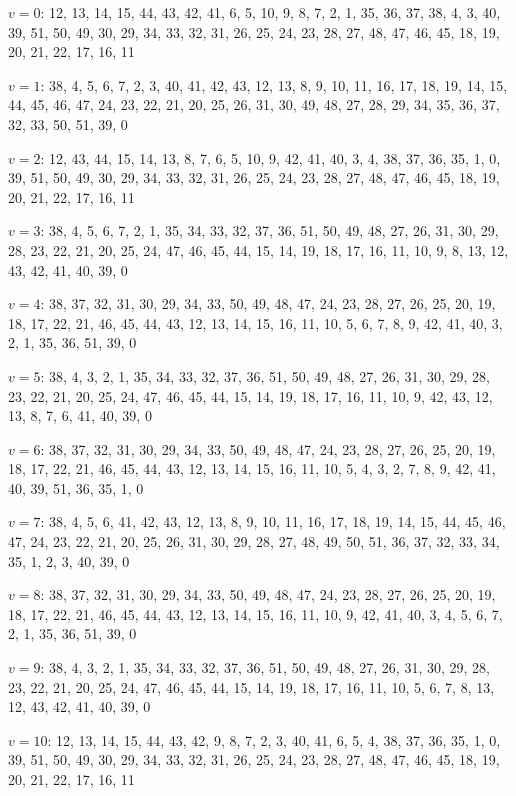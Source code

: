 \documentclass{amcjoucc}
\begin{document}
\begin{itemize}
{\footnotesize
\item $v = 0$: 12, 13, 14, 15, 44, 43, 42, 41, 6, 5, 10, 9, 8, 7, 2, 1, 35, 36, 37, 38, 4, 3, 40, 39, 51, 50, 49, 30, 29, 34, 33, 32, 31, 26, 25, 24, 23, 28, 27, 48, 47, 46, 45, 18, 19, 20, 21, 22, 17, 16, 11
\item $v = 1$: 38, 4, 5, 6, 7, 2, 3, 40, 41, 42, 43, 12, 13, 8, 9, 10, 11, 16, 17, 18, 19, 14, 15, 44, 45, 46, 47, 24, 23, 22, 21, 20, 25, 26, 31, 30, 49, 48, 27, 28, 29, 34, 35, 36, 37, 32, 33, 50, 51, 39, 0
\item $v = 2$: 12, 43, 44, 15, 14, 13, 8, 7, 6, 5, 10, 9, 42, 41, 40, 3, 4, 38, 37, 36, 35, 1, 0, 39, 51, 50, 49, 30, 29, 34, 33, 32, 31, 26, 25, 24, 23, 28, 27, 48, 47, 46, 45, 18, 19, 20, 21, 22, 17, 16, 11
\item $v = 3$: 38, 4, 5, 6, 7, 2, 1, 35, 34, 33, 32, 37, 36, 51, 50, 49, 48, 27, 26, 31, 30, 29, 28, 23, 22, 21, 20, 25, 24, 47, 46, 45, 44, 15, 14, 19, 18, 17, 16, 11, 10, 9, 8, 13, 12, 43, 42, 41, 40, 39, 0
\item $v = 4$: 38, 37, 32, 31, 30, 29, 34, 33, 50, 49, 48, 47, 24, 23, 28, 27, 26, 25, 20, 19, 18, 17, 22, 21, 46, 45, 44, 43, 12, 13, 14, 15, 16, 11, 10, 5, 6, 7, 8, 9, 42, 41, 40, 3, 2, 1, 35, 36, 51, 39, 0
\item $v = 5$: 38, 4, 3, 2, 1, 35, 34, 33, 32, 37, 36, 51, 50, 49, 48, 27, 26, 31, 30, 29, 28, 23, 22, 21, 20, 25, 24, 47, 46, 45, 44, 15, 14, 19, 18, 17, 16, 11, 10, 9, 42, 43, 12, 13, 8, 7, 6, 41, 40, 39, 0
\item $v = 6$: 38, 37, 32, 31, 30, 29, 34, 33, 50, 49, 48, 47, 24, 23, 28, 27, 26, 25, 20, 19, 18, 17, 22, 21, 46, 45, 44, 43, 12, 13, 14, 15, 16, 11, 10, 5, 4, 3, 2, 7, 8, 9, 42, 41, 40, 39, 51, 36, 35, 1, 0
\item $v = 7$: 38, 4, 5, 6, 41, 42, 43, 12, 13, 8, 9, 10, 11, 16, 17, 18, 19, 14, 15, 44, 45, 46, 47, 24, 23, 22, 21, 20, 25, 26, 31, 30, 29, 28, 27, 48, 49, 50, 51, 36, 37, 32, 33, 34, 35, 1, 2, 3, 40, 39, 0
\item $v = 8$: 38, 37, 32, 31, 30, 29, 34, 33, 50, 49, 48, 47, 24, 23, 28, 27, 26, 25, 20, 19, 18, 17, 22, 21, 46, 45, 44, 43, 12, 13, 14, 15, 16, 11, 10, 9, 42, 41, 40, 3, 4, 5, 6, 7, 2, 1, 35, 36, 51, 39, 0
\item $v = 9$: 38, 4, 3, 2, 1, 35, 34, 33, 32, 37, 36, 51, 50, 49, 48, 27, 26, 31, 30, 29, 28, 23, 22, 21, 20, 25, 24, 47, 46, 45, 44, 15, 14, 19, 18, 17, 16, 11, 10, 5, 6, 7, 8, 13, 12, 43, 42, 41, 40, 39, 0
\item $v = 10$: 12, 13, 14, 15, 44, 43, 42, 9, 8, 7, 2, 3, 40, 41, 6, 5, 4, 38, 37, 36, 35, 1, 0, 39, 51, 50, 49, 30, 29, 34, 33, 32, 31, 26, 25, 24, 23, 28, 27, 48, 47, 46, 45, 18, 19, 20, 21, 22, 17, 16, 11
}
\end{itemize}
\end{document}
